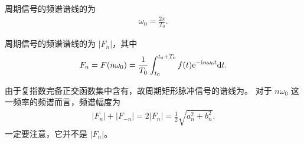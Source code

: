 \begin{property}[周期信号的频谱谱线的特点]
    周期信号的频谱谱线的为
    \begin{align*}
        \omega_0 = \frac{2\pi}{T_0}.
    \end{align*}
    
    周期信号的频谱谱线的为 $|F_n|$，其中
    \begin{align*}
        F_n = F(n\omega_0) = \frac{1}{T_0}\int_{t_0}^{t_0 + T_0}f(t)\mathrm{e}^{-\mathrm{i} n\omega_0 t}\mathrm{d}{t}.
    \end{align*}
\end{property}

\begin{note}
    由于复指数完备正交函数集中含有，故周期矩形脉冲信号的谱线为。
    对于 $n\omega_0$ 这一频率的频谱而言，频谱幅度为
    \begin{align*}
        |F_n| + |F_{-n}| = 2|F_n| = \frac{1}{2}\sqrt{a_n^2 + b_n^2}.
    \end{align*}
    一定要注意，它并不是 $|F_n|$。
\end{note}
